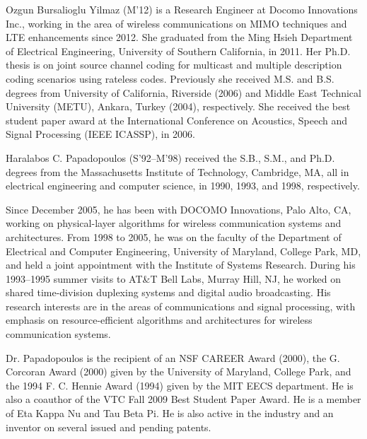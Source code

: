 \documentclass[journal,comsoc]{IEEEtran}
\begin{document}
\begin{IEEEbiography}{Ozgun Bursalioglu Yilmaz}
(M'12) is a Research Engineer at Docomo Innovations Inc., working in the area of wireless communications on MIMO techniques and LTE enhancements since 2012. She graduated from the Ming Hsieh Department of Electrical Engineering, University of Southern California, in 2011.  Her Ph.D. thesis is on joint source channel coding for multicast and multiple description coding scenarios using rateless codes. Previously she received M.S. and B.S. degrees from University of California, Riverside (2006) and Middle East Technical University (METU), Ankara, Turkey (2004), respectively. She received the best student paper award at the International Conference on Acoustics, Speech and Signal Processing (IEEE ICASSP), in 2006.
\end{IEEEbiography}

\begin{IEEEbiography}{Haralabos C. Papadopoulos} (S'92--M'98) received the S.B., S.M., and Ph.D. degrees from the Massachusetts Institute of Technology, Cambridge, MA, all in electrical engineering and computer science, in 1990, 1993, and 1998, respectively.

Since December 2005, he has been with DOCOMO Innovations, Palo Alto, CA,  working on physical-layer algorithms for wireless communication systems and architectures. From 1998 to 2005, he was on the faculty of the Department of Electrical and Computer Engineering, University of Maryland, College Park, MD, and held a joint appointment with the Institute of Systems Research. During his 1993--1995 summer visits to AT\&T Bell Labs, Murray Hill, NJ, he worked on shared time-division duplexing systems and digital audio broadcasting.  His research interests are in the areas of communications and signal processing, with emphasis on resource-efficient algorithms and architectures for wireless communication systems.

Dr. Papadopoulos is the recipient of an NSF CAREER Award (2000), the G. Corcoran Award (2000) given by the University of Maryland, College Park, and the 1994 F. C. Hennie Award (1994) given by the MIT EECS department. He is also a coauthor of the VTC Fall 2009 Best Student Paper Award.  He is a member of Eta Kappa Nu and Tau Beta Pi. He is also active in the industry and an inventor on several issued and pending patents. 
\end{IEEEbiography}

\end{document}
